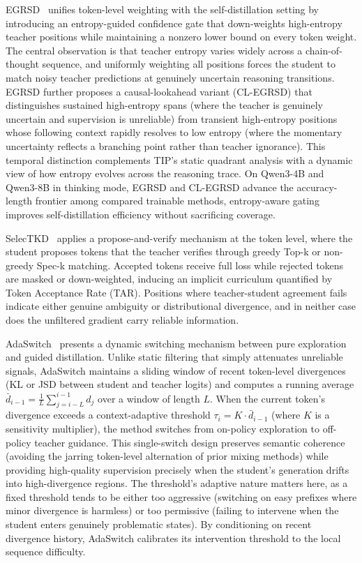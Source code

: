 \documentclass{article} %
\begin{document}
EGRSD~\citep{2605.13255} unifies token-level weighting with the self-distillation setting by introducing an entropy-guided confidence gate that down-weights high-entropy teacher positions while maintaining a nonzero lower bound on every token weight. The central observation is that teacher entropy varies widely across a chain-of-thought sequence, and uniformly weighting all positions forces the student to match noisy teacher predictions at genuinely uncertain reasoning transitions. EGRSD further proposes a causal-lookahead variant (CL-EGRSD) that distinguishes sustained high-entropy spans (where the teacher is genuinely uncertain and supervision is unreliable) from transient high-entropy positions whose following context rapidly resolves to low entropy (where the momentary uncertainty reflects a branching point rather than teacher ignorance). This temporal distinction complements TIP's static quadrant analysis with a dynamic view of how entropy evolves across the reasoning trace. On Qwen3-4B and Qwen3-8B in thinking mode, EGRSD and CL-EGRSD advance the accuracy-length frontier among compared trainable methods, entropy-aware gating improves self-distillation efficiency without sacrificing coverage.

SelecTKD~\citep{2510.24021} applies a propose-and-verify mechanism at the token level, where the student proposes tokens that the teacher verifies through greedy Top-k or non-greedy Spec-k matching. Accepted tokens receive full loss while rejected tokens are masked or down-weighted, inducing an implicit curriculum quantified by Token Acceptance Rate (TAR). Positions where teacher-student agreement fails indicate either genuine ambiguity or distributional divergence, and in neither case does the unfiltered gradient carry reliable information.

AdaSwitch~\citep{2510.07842} presents a dynamic switching mechanism between pure exploration and guided distillation. Unlike static filtering that simply attenuates unreliable signals, AdaSwitch maintains a sliding window of recent token-level divergences (KL or JSD between student and teacher logits) and computes a running average $\bar{d}_{i-1} = \frac{1}{L}\sum_{j=i-L}^{i-1} d_j$ over a window of length $L$. When the current token's divergence exceeds a context-adaptive threshold $\tau_i = K \cdot \bar{d}_{i-1}$ (where $K$ is a sensitivity multiplier), the method switches from on-policy exploration to off-policy teacher guidance. This single-switch design preserves semantic coherence (avoiding the jarring token-level alternation of prior mixing methods) while providing high-quality supervision precisely when the student's generation drifts into high-divergence regions. The threshold's adaptive nature matters here, as a fixed threshold tends to be either too aggressive (switching on easy prefixes where minor divergence is harmless) or too permissive (failing to intervene when the student enters genuinely problematic states). By conditioning on recent divergence history, AdaSwitch calibrates its intervention threshold to the local sequence difficulty.
\end{document}
